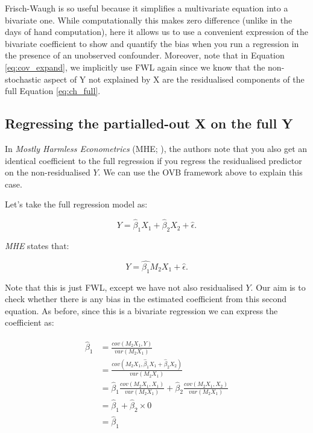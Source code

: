 \documentclass[
]{book}
\begin{document}
Frisch-Waugh is so useful because it simplifies a multivariate equation into a bivariate one. While computationally this makes zero difference (unlike in the days of hand computation), here it allows us to use a convenient expression of the bivariate coefficient to show and quantify the bias when you run a regression in the presence of an unobserved confounder. Moreover, note that in Equation \ref{eq:cov_expand}, we implicitly use FWL again since we know that the non-stochastic aspect of Y not explained by X are the residualised components of the full Equation \ref{eq:ch_full}.

\hypertarget{regressing-the-partialled-out-x-on-the-full-y}{%
\subsection{Regressing the partialled-out X on the full Y}\label{regressing-the-partialled-out-x-on-the-full-y}}

In \emph{Mostly Harmless Econometrics} (MHE; \citet{AngristMostlyHarmlessEconometrics2009}), the authors note that you also get an identical coefficient to the full regression if you regress the residualised predictor on the non-residualised \(Y\). We can use the OVB framework above to explain this case.

Let's take the full regression model as:

\begin{equation}
Y = \hat{\beta}_1X_1 + \hat{\beta}_2X_2 + \hat{\epsilon}.    
\end{equation}

\textit{MHE} states that:

\begin{equation}
    Y = \hat{\beta_1}M_2X_1 + \hat{\epsilon}.
\end{equation}

Note that this is just FWL, except we have not also residualised \(Y\). Our aim is to check whether there is any bias in the estimated coefficient from this second equation. As before, since this is a bivariate regression we can express the coefficient as:

\begin{align}
    \begin{aligned}
    \hat{\beta}_1 &= \frac{cov(M_2X_1, Y)}{var(M_2X_1)} \\
    &= \frac{cov(M_2X_1, \hat{\beta}_1X_1 + \hat{\beta}_2X_2)}{var(M_2X_1)} \\
    &= \hat{\beta}_1\frac{cov(M_2X_1,X_1)}{var(M_2X_1)} + \hat{\beta}_2\frac{cov(M_2X_1,X_2)}{var(M_2X_1)} \\
    &= \hat{\beta}_1 + \hat{\beta}_2\times 0 \\
    &= \hat{\beta}_1
    \end{aligned}
\end{align}
\end{document}
